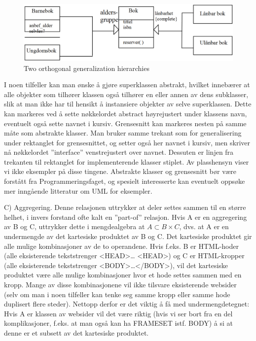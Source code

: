 \begin{figure}[H]
    \centering
    \includegraphics[scale=0.35]{resources/orthogonal-generalization-hierarchy-example.PNG}
    \caption{Two orthogonal generalization hierarchies}
    \label{fig:orthogonal-generalization-hierarchy-example}
\end{figure}


I noen tilfeller kan man ønske å gjøre superklassen abstrakt, hvilket innebærer at alle objekter som tilhører klassen også tilhører en eller annen av dens subklasser, slik at man ikke har til hensikt å instansiere objekter av selve superklassen. Dette kan markeres ved å sette nøkkelordet {abstract} høyrejustert under klassens navn, eventuelt også sette navnet i kursiv. Grensesnitt kan markeres nesten på samme måte som abstrakte klasser. Man bruker samme trekant som for generalisering under rektanglet for grensesnittet, og setter også her navnet i kursiv, men skriver nå nøkkelordet ”interface” venstrejustert over navnet. Dessuten er linjen fra trekanten til rektanglet for implementerende klasser stiplet. Av plasshensyn viser vi ikke eksempler på disse tingene. Abstrakte klasser og grensesnitt bør være forstått fra Programmeringsfaget, og spesielt interesserte kan eventuelt oppsøke mer inngående litteratur om UML for eksempler.

C) Aggregering. Denne relasjonen uttrykker at deler settes sammen til en større helhet, i invers forstand ofte kalt en ”part-of” relasjon. Hvis A er en aggregering av B og C, uttrykker dette i mengdealgebra at $ A \subset B \times C $, dvs. at A er en undermengde av det kartesiske produktet av B og C. Det kartesiske produktet gir alle mulige kombinasjoner av de to operandene. Hvis f.eks. B er HTML-hoder (alle eksisterende tekststrenger \textless HEAD\textgreater … \textless HEAD\textgreater ) og C er HTML-kropper (alle eksisterende tekststrenger \textless BODY\textgreater …\textless /BODY\textgreater ), vil det kartesiske produktet være alle mulige kombinasjoner hvor et hode settes sammen med en kropp. Mange av disse kombinasjonene vil ikke tilsvare eksisterende websider (selv om man i noen tilfeller kan tenke seg samme kropp eller samme hode duplisert flere steder). Nettopp derfor er det viktig å få med undermengdetegnet: Hvis A er klassen av websider vil det være riktig (hvis vi ser bort fra en del komplikasjoner, f.eks. at man også kan ha FRAMESET istf. BODY) å si at denne er et subsett av det kartesiske produktet.

